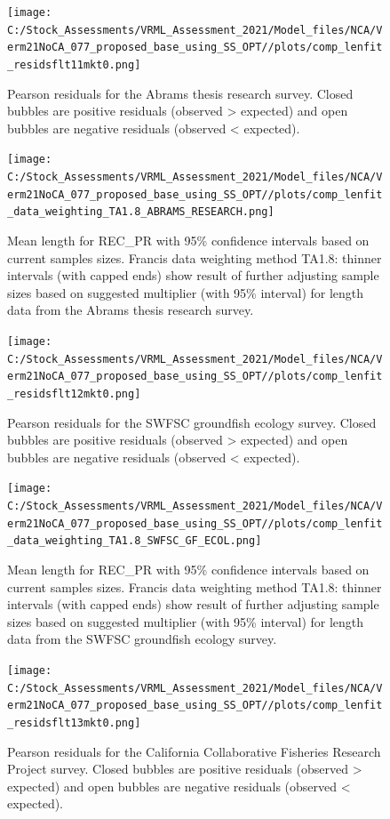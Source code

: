 \documentclass[
  english,
  a4paper,
]{article}
\begin{document}
\begin{figure}
\centering
\texttt{[image: C:/Stock\_Assessments/VRML\_Assessment\_2021/Model\_files/NCA/Verm21NoCA\_077\_proposed\_base\_using\_SS\_OPT//plots/comp\_lenfit\_residsflt11mkt0.png]}
\caption{Pearson residuals for the Abrams thesis research survey. Closed bubbles are positive residuals (observed \textgreater{} expected) and open bubbles are negative residuals (observed \textless{} expected).\label{fig:len-pearson-ABRAMS-RESEARCH}}
\end{figure}

\begin{figure}
\centering
\texttt{[image: C:/Stock\_Assessments/VRML\_Assessment\_2021/Model\_files/NCA/Verm21NoCA\_077\_proposed\_base\_using\_SS\_OPT//plots/comp\_lenfit\_data\_weighting\_TA1.8\_ABRAMS\_RESEARCH.png]}
\caption{Mean length for REC\_PR with 95\% confidence intervals based on current samples sizes. Francis data weighting method TA1.8: thinner intervals (with capped ends) show result of further adjusting sample sizes based on suggested multiplier (with 95\% interval) for length data from the Abrams thesis research survey.\label{fig:mean-len-fit-ABRAMS-RESEARCH}}
\end{figure}

\begin{figure}
\centering
\texttt{[image: C:/Stock\_Assessments/VRML\_Assessment\_2021/Model\_files/NCA/Verm21NoCA\_077\_proposed\_base\_using\_SS\_OPT//plots/comp\_lenfit\_residsflt12mkt0.png]}
\caption{Pearson residuals for the SWFSC groundfish ecology survey. Closed bubbles are positive residuals (observed \textgreater{} expected) and open bubbles are negative residuals (observed \textless{} expected).\label{fig:len-pearson-SWFSC-GF-ECOL}}
\end{figure}

\begin{figure}
\centering
\texttt{[image: C:/Stock\_Assessments/VRML\_Assessment\_2021/Model\_files/NCA/Verm21NoCA\_077\_proposed\_base\_using\_SS\_OPT//plots/comp\_lenfit\_data\_weighting\_TA1.8\_SWFSC\_GF\_ECOL.png]}
\caption{Mean length for REC\_PR with 95\% confidence intervals based on current samples sizes. Francis data weighting method TA1.8: thinner intervals (with capped ends) show result of further adjusting sample sizes based on suggested multiplier (with 95\% interval) for length data from the SWFSC groundfish ecology survey.\label{fig:mean-len-fit-SWFSC-GF-ECOL}}
\end{figure}

\begin{figure}
\centering
\texttt{[image: C:/Stock\_Assessments/VRML\_Assessment\_2021/Model\_files/NCA/Verm21NoCA\_077\_proposed\_base\_using\_SS\_OPT//plots/comp\_lenfit\_residsflt13mkt0.png]}
\caption{Pearson residuals for the California Collaborative Fisheries Research Project survey. Closed bubbles are positive residuals (observed \textgreater{} expected) and open bubbles are negative residuals (observed \textless{} expected).\label{fig:len-pearson-CCFRP}}
\end{figure}
\end{document}
